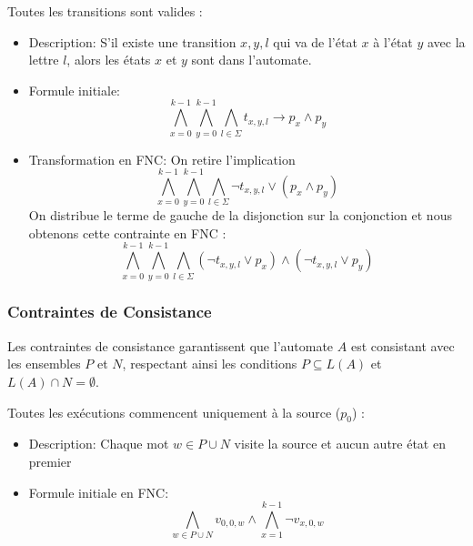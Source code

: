 \begin{tcolorbox}[defaultstyle,title=Contrainte 3]
    Toutes les transitions sont valides :
    \begin{itemize}
        \item Description: S'il existe une transition \( x,y,l \) qui va de l'état \(x\) à l'état \(y\) avec la lettre \(l\), alors les états \(x\) et \(y\) sont dans l'automate.\\
        \item Formule initiale: \[ \bigwedge\limits_{x=0}^{k-1}\bigwedge\limits_{y=0}^{k-1}\bigwedge\limits_{l\in\Sigma} t_{x,y,l} \rightarrow p_{x} \land p_{y} \]
        \item Transformation en FNC: On retire l'implication
        \[ \bigwedge\limits_{x=0}^{k-1}\bigwedge\limits_{y=0}^{k-1}\bigwedge\limits_{l\in\Sigma} \lnot t_{x,y,l} \lor (p_{x} \land p_{y}) \]
        On distribue le terme de gauche de la disjonction sur la conjonction et nous obtenons cette contrainte en FNC :
        \[ \bigwedge\limits_{x=0}^{k-1}\bigwedge\limits_{y=0}^{k-1}\bigwedge\limits_{l\in\Sigma} (\lnot t_{x,y,l} \lor p_{x}) \land (\lnot t_{x,y,l} \lor p_{y}) \]
    \end{itemize}
\end{tcolorbox}






\subsubsection*{Contraintes de Consistance}
\label{consistance}

Les contraintes de consistance garantissent que l'automate \( A \) est consistant avec les ensembles \( P \) et \( N \), respectant ainsi les conditions \( P \subseteq L(A) \) et \( L(A) \cap N = \emptyset \).

\begin{tcolorbox}[defaultstyle,title=Contrainte 1]
    Toutes les exécutions commencent uniquement à la source (\(p_0\)) :
    \begin{itemize}  
        \item Description: Chaque mot \(w \in P \cup N \) visite la source et aucun autre état en premier\\
    
        \item Formule initiale en FNC:
        \[ \bigwedge\limits_{w\in P \cup N} v_{0,0,w}\land \bigwedge\limits_{x=1}^{k-1}\lnot v_{x,0, w}\]
    \end{itemize}
\end{tcolorbox}

